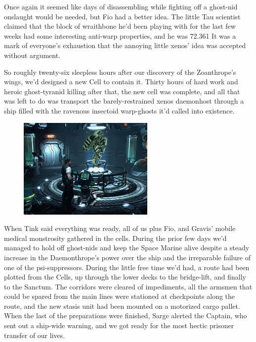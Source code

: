 Once again it seemed like days of disassembling while fighting off a ghost-nid onslaught would be needed, but Fio had a better idea. 
The little Tau scientist claimed that the block of wraithbone he'd been playing with for the last few weeks had some interesting anti-warp properties, and he was 72.361%
It was a mark of everyone's exhaustion that the annoying little xenos' idea was accepted without argument.

So roughly twenty-six sleepless hours after our discovery of the Zoanthrope's wings, we'd designed a new Cell to contain it. 
Thirty hours of hard work and heroic ghost-tyranid killing after that, the new cell was complete, and all that was left to do was transport the barely-restrained xenos daemonhost through a ship filled with the ravenous insectoid warp-ghosts it'd called into existence.

\begin{figure}
	\begin{center}
		\includegraphics[width=\figwidth]{pics/15/46.png}
	\end{center}
\end{figure}
When Tink said everything was ready, all of us plus Fio, and Gravis' mobile medical monstrosity gathered in the cells. 
During the prior few days we'd managed to hold off ghost-nids and keep the Space Marine alive despite a steady increase in the Daemonthrope's power over the ship and the irreparable failure of one of the psi-suppressors. 
During the little free time we'd had, a route had been plotted from the Cells, up through the lower decks to the bridge-lift, and finally to the Sanctum. 
The corridors were cleared of impediments, all the armsmen that could be spared from the main lines were stationed at checkpoints along the route, and the new stasis unit had been mounted on a motorized cargo pallet. 
When the last of the preparations were finished, Sarge alerted the Captain, who sent out a ship-wide warning, and we got ready for the most hectic prisoner transfer of our lives.

